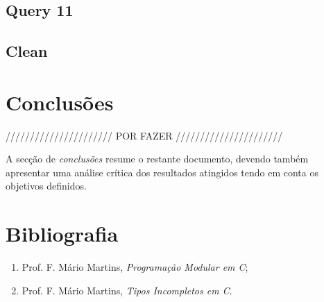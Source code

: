 \documentclass[a4paper]{article}
\begin{document}
\subsection{Query 11}

\subsection{Clean}

\section{Conclusões}
\label{sec:conclusao}

////////////////////// POR FAZER //////////////////////

A secção de \emph{conclusões} resume o restante documento, devendo
também apresentar uma análise crítica dos resultados atingidos tendo
em conta os objetivos definidos.

\section{Bibliografia}

\begin{enumerate} 
	\item Prof. F. Mário Martins, \textit{Programação Modular em C};
	\item Prof. F. Mário Martins, \textit{Tipos Incompletos em C}.
\end{enumerate}
\end{document}
